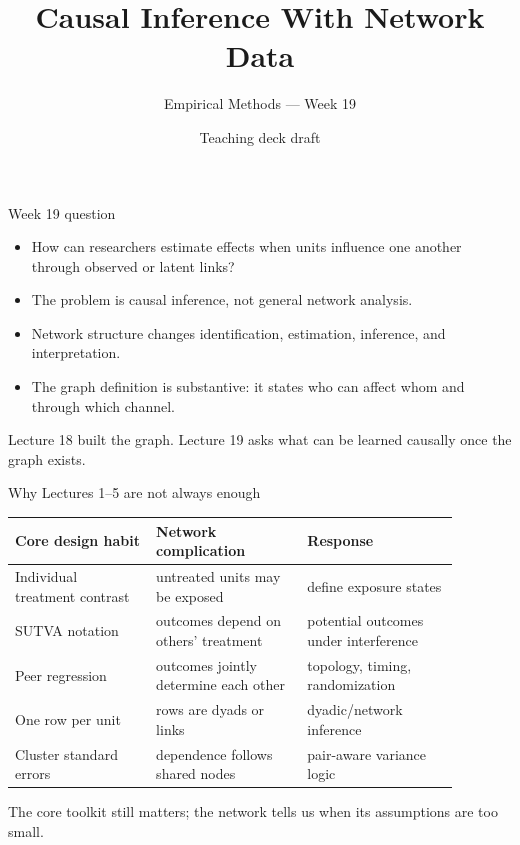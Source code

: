 \documentclass[aspectratio=169,11pt]{beamer}
\title{Causal Inference With Network Data}
\subtitle{Empirical Methods --- Week 19}
\author{Teaching deck draft}
\date{}
\newcommand{\1}{\mathbf{1}}
\begin{document}
\begin{frame}
  \titlepage
\end{frame}

\begin{frame}{Week 19 question}
\begin{itemize}
    \item How can researchers estimate effects when units influence one another through observed or latent links?
    \item The problem is causal inference, not general network analysis.
    \item Network structure changes identification, estimation, inference, and interpretation.
    \item The graph definition is substantive: it states who can affect whom and through which channel.
\end{itemize}

\medskip
Lecture 18 built the graph. Lecture 19 asks what can be learned causally once the graph exists.
\end{frame}

\begin{frame}{Why Lectures 1--5 are not always enough}
\small
\begin{tabular}{p{0.28\linewidth} p{0.30\linewidth} p{0.30\linewidth}}
\toprule
Core design habit & Network complication & Response \\
\midrule
Individual treatment contrast & untreated units may be exposed & define exposure states \\
SUTVA notation & outcomes depend on others' treatment & potential outcomes under interference \\
Peer regression & outcomes jointly determine each other & topology, timing, randomization \\
One row per unit & rows are dyads or links & dyadic/network inference \\
Cluster standard errors & dependence follows shared nodes & pair-aware variance logic \\
\bottomrule
\end{tabular}

\medskip
The core toolkit still matters; the network tells us when its assumptions are too small.
\end{frame}
\end{document}
